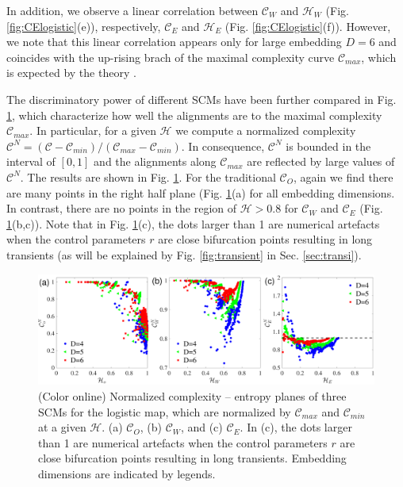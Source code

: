 \documentclass[aip,cha,reprint,nofootinbib]{revtex4-1}
\begin{document}
{\color{red}In addition, we observe a linear correlation between $\mathcal{C}_W$ and $\mathcal{H}_{W}$ (Fig. \ref{fig:CElogistic}(e)), respectively, $\mathcal{C}_{E}$ and $\mathcal{H}_{E}$ (Fig. \ref{fig:CElogistic}(f)). However, we note that this linear correlation appears only for large embedding $D = 6$ and coincides with the up-rising brach of the maximal complexity curve $\mathcal{C}_{max}$, which is expected by the theory \cite{SMCbook2010}.}

{\color{red} The discriminatory power of different SCMs have been further compared in Fig. \ref{fig:CHlogCmax}, which characterize how well the alignments are to the maximal complexity $\mathcal{C}_{max}$. In particular, for a given $\mathcal{H}$ we compute a normalized complexity $\mathcal{C}^{N} = (\mathcal{C} - \mathcal{C}_{min}) / (\mathcal{C}_{max} - \mathcal{C}_{min})$. In consequence, $\mathcal{C}^{N}$ is bounded in the interval of $[0, 1]$ and the alignments along $\mathcal{C}_{max}$ are reflected by large values of $\mathcal{C}^{N}$. The results are shown in Fig. \ref{fig:CHlogCmax}. For the traditional $\mathcal{C}_{O}$, again we find there are many points in the right half plane (Fig. \ref{fig:CHlogCmax}(a) for all embedding dimensions. In contrast,  there are no points in the region of $\mathcal{H} >0.8$ for $\mathcal{C}_W$ and $\mathcal{C}_E$ (Fig. \ref{fig:CHlogCmax}(b,c)). Note that in Fig. \ref{fig:CHlogCmax}(c), the dots larger than 1 are numerical artefacts when the control parameters $r$ are close bifurcation points resulting in long transients (as will be explained by Fig. \ref{fig:transient} in Sec. \ref{sec:transi}).  
\begin{figure}
        \centering
        \includegraphics[width=2\columnwidth]{CompEntropyCNormalized_Logistic.pdf}
\caption{(Color online) Normalized complexity -- entropy planes of three SCMs for the logistic map, which are normalized by $\mathcal{C}_{max}$ and $\mathcal{C}_{min}$  at a given $\mathcal{H}$. (a) $\mathcal{C}_O$, (b) $\mathcal{C}_W$, and (c) $\mathcal{C}_E$. In (c), the dots larger than 1 are numerical artefacts when the control parameters $r$ are close bifurcation points resulting in long transients. Embedding dimensions are indicated by legends.  \label{fig:CHlogCmax}}
\end{figure}
}
\end{document}
